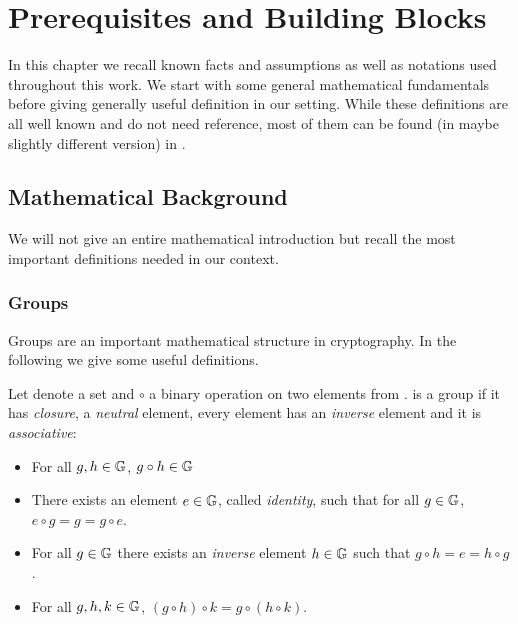 
\chapter{Prerequisites and Building Blocks}

In this chapter we recall known facts and assumptions as well as notations used throughout this work.
We start with some general mathematical fundamentals before giving generally useful definition in our setting.
While these definitions are all well known and do not need reference, most of them can be found (in maybe slightly different version) in \cite{katz2008introduction}.


\section{Mathematical Background}
We will not give an entire mathematical introduction but recall the most important definitions needed in our context.

\subsection{Groups}
Groups are an important mathematical structure in cryptography.
In the following we give some useful definitions.

\begin{definition}[Groups]\label{def:groups}
Let \GG denote a set and $\circ$ a binary operation on two elements from \GG.
\GG is a group if it has \emph{closure}, a \emph{neutral} element, every element has an \emph{inverse} element and it is \emph{associative}:
\begin{itemize}
	\item For all $g,h\in\mathbb{G}$, $g\circ h \in\mathbb{G}$
	\item There exists an element $e\in\mathbb{G}$, called \emph{identity}, such that for all $g\in\mathbb{G}$, $e\circ g=g=g\circ e$.
	\item For all $g\in\mathbb{G}$ there exists an \emph{inverse} element $h\in\mathbb{G}$ such that $g\circ h=e=h\circ g$.
	\item For all $g,h,k\in\mathbb{G}$, $(g\circ h)\circ k=g\circ (h \circ k)$.
\end{itemize}
\eod
\end{definition}

